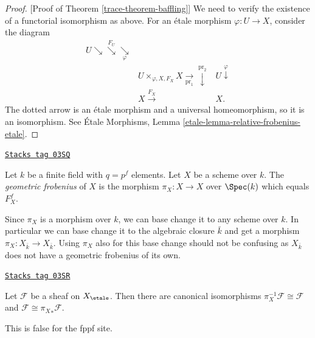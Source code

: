 \begin{proof}
[Proof of Theorem \ref{trace-theorem-baffling}]
We need to verify the existence of a functorial isomorphism as above. For an
\'etale morphism $\varphi : U \to X$, consider the diagram
$$
\begin{array}{ccc}U \searrow\overset{F_U}{\searrow}\underset{\varphi}{\searrow} &  &  \\  & {U \times_{\varphi, X, F_X} X} \underset{\text{pr}_1}{\longrightarrow}\overset{\text{pr}_2}{\downarrow} & U \overset{\varphi}{\downarrow} \\  & X \overset{F_X}{\longrightarrow} & X.\end{array}
$$
The dotted arrow is an \'etale morphism and a universal
homeomorphism, so it is an isomorphism. See
\'Etale Morphisms, Lemma \ref{etale-lemma-relative-frobenius-etale}.
\end{proof}


\begin{definition}
\label{trace-definition-geometric-frobenius}
\href{https://stacks.math.columbia.edu/tag/03SQ}{\texttt{Stacks tag 03SQ}}

Let $k$ be a finite field with $q = p^f$ elements. Let $X$ be a scheme
over $k$. The {\it geometric frobenius} of $X$ is the morphism
$\pi_X : X \to X$ over $\Spec(k)$ which equals $F_X^f$.
\end{definition}

Since $\pi_X$ is a morphism over $k$, we can base change it to any scheme over
$k$. In particular we can base change it to the algebraic closure $\bar k$
and get a morphism $\pi_X : X_{\bar k} \to X_{\bar k}$. Using $\pi_X$ also
for this base change should not be
confusing as $X_{\bar k}$ does not have a geometric frobenius of its own.

\begin{lemma}
\label{trace-lemma-sheaf-over-finite-field-has-frobenius-descent}
\href{https://stacks.math.columbia.edu/tag/03SR}{\texttt{Stacks tag 03SR}}

Let $\mathcal{F}$ be a sheaf on $X_\etale$.
Then there are canonical isomorphisms
$\pi_X^{-1} \mathcal{F} \cong \mathcal{F}$ and
$\mathcal{F} \cong {\pi_X}_*\mathcal{F}$.
\end{lemma}

This is false for the fppf site.

